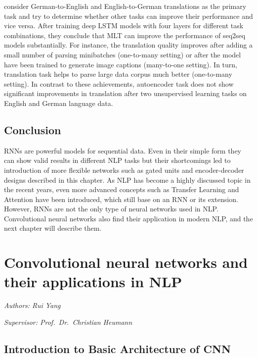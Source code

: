 \documentclass[]{krantz}
\begin{document}
\citet{luong2015multi} consider German-to-English and English-to-German translations as the primary task and try to determine whether other tasks can improve their performance and vice versa. After training deep LSTM models with four layers for different task combinations, they conclude that MLT can improve the performance of seq2seq models substantially. For instance, the translation quality improves after adding a small number of parsing minibatches (one-to-many setting) or after the model have been trained to generate image captions (many-to-one setting). In turn, translation task helps to parse large data corpus much better (one-to-many setting). In contrast to these achievements, autoencoder task does not show significant improvements in translation after two unsupervised learning tasks on English and German language data.

\hypertarget{conclusion}{%
\section{Conclusion}\label{conclusion}}

RNNs are powerful models for sequential data. Even in their simple form they can show valid results in different NLP tasks but their shortcomings led to introduction of more flexible networks such as gated units and encoder-decoder designs described in this chapter. As NLP has become a highly discussed topic in the recent years, even more advanced concepts such as Transfer Learning and Attention have been introduced, which still base on an RNN or its extension. However, RNNs are not the only type of neural networks used in NLP. Convolutional neural networks also find their application in modern NLP, and the next chapter will describe them.

\hypertarget{convolutional-neural-networks-and-their-applications-in-nlp}{%
\chapter{Convolutional neural networks and their applications in NLP}\label{convolutional-neural-networks-and-their-applications-in-nlp}}

\emph{Authors: Rui Yang}

\emph{Supervisor: Prof.~Dr.~Christian Heumann}

\hypertarget{introduction-to-basic-architecture-of-cnn}{%
\section{Introduction to Basic Architecture of CNN}\label{introduction-to-basic-architecture-of-cnn}}
\end{document}
